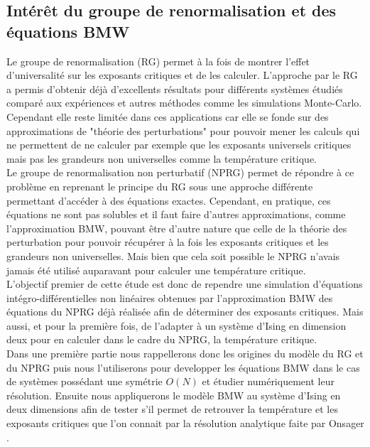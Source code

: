 \documentclass[10pt]{article}
\begin{document}
\begin{multicols}{2}
\subsection{Intérêt du groupe de renormalisation et des équations BMW}

Le groupe de renormalisation (RG) permet à la fois de montrer l'effet d'universalité sur les exposants critiques et de les calculer. L'approche par le RG a permis d'obtenir déjà d'excellents résultats \cite{} pour différents systèmes étudiés comparé aux expériences et autres méthodes comme les simulations Monte-Carlo. Cependant elle reste limitée dans ces applications car elle se fonde sur des approximations de "théorie des perturbations" pour pouvoir mener les calculs qui ne permettent de ne calculer par exemple que les exposants universels critiques mais pas les grandeurs non universelles comme la température critique.\\

Le groupe de renormalisation non perturbatif (NPRG) permet de répondre à ce problème en reprenant le principe du RG sous une approche différente permettant d'accéder à des équations exactes. Cependant, en pratique, ces équations ne sont pas solubles et il faut faire d'autres approximations, comme l'approximation BMW, pouvant être d'autre nature que celle de la théorie des perturbation pour pouvoir récupérer à la fois les exposants critiques et les grandeurs non universelles. Mais bien que cela soit possible le NPRG n'avais jamais été utilisé auparavant pour calculer une température critique. \\

L'objectif premier de cette étude est donc de rependre une simulation d'équations intégro-différentielles non linéaires obtenues par l'approximation BMW des équations du NPRG déjà réalisée \cite{LeonardThesis} afin de déterminer des exposants critiques. Mais aussi, et pour la première fois, de l'adapter à un système d'Ising en dimension deux pour en calculer dans le cadre du NPRG, la température critique. \\

Dans une première partie nous rappellerons donc les origines du modèle du RG et du NPRG puis nous l'utiliserons pour developper les équations BMW dans le cas de systèmes possédant une symétrie $O(N)$ et étudier numériquement leur résolution. Ensuite nous appliquerons le modèle BMW au système d'Ising en deux dimensions afin de tester s'il permet de retrouver la température et les exposants critiques que l'on connait par la résolution analytique faite par Onsager \cite{Onsager}. 


\end{multicols}
\end{document}
